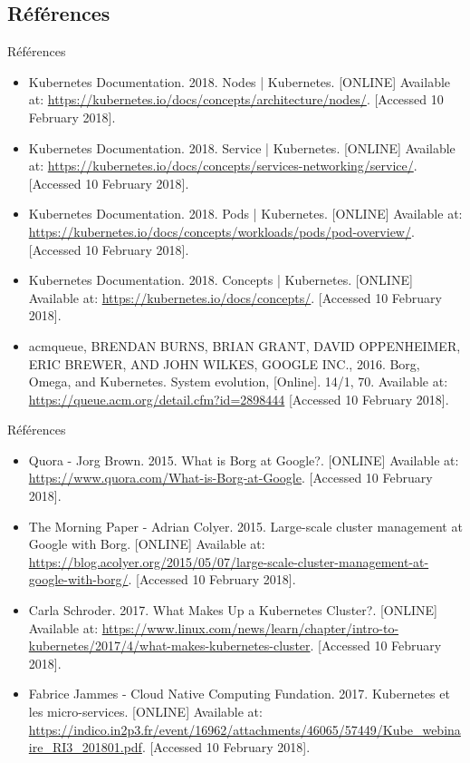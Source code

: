 \documentclass{bredelebeamer}
\begin{document}
\subsection{Références}
\begin{frame}{Références}
\begin{itemize}
\item Kubernetes Documentation. 2018. Nodes | Kubernetes. [ONLINE] Available at: \url{https://kubernetes.io/docs/concepts/architecture/nodes/}. [Accessed 10 February 2018].
\item Kubernetes Documentation. 2018. Service | Kubernetes. [ONLINE] Available at: \url{https://kubernetes.io/docs/concepts/services-networking/service/}. [Accessed 10 February 2018].
\item Kubernetes Documentation. 2018. Pods | Kubernetes. [ONLINE] Available at: \url{https://kubernetes.io/docs/concepts/workloads/pods/pod-overview/}. [Accessed 10 February 2018].
\item Kubernetes Documentation. 2018. Concepts | Kubernetes. [ONLINE] Available at: \url{https://kubernetes.io/docs/concepts/}. [Accessed 10 February 2018].
\item acmqueue, BRENDAN BURNS, BRIAN GRANT, DAVID OPPENHEIMER, ERIC BREWER, AND JOHN WILKES, GOOGLE INC., 2016. Borg, Omega, and Kubernetes. System evolution, [Online]. 14/1, 70. Available at: \url{https://queue.acm.org/detail.cfm?id=2898444} [Accessed 10 February 2018].
\end{itemize}
\end{frame}

\begin{frame}{Références}
\begin{itemize}
\item Quora - Jorg Brown. 2015. What is Borg at Google?. [ONLINE] Available at: \url{https://www.quora.com/What-is-Borg-at-Google}. [Accessed 10 February 2018].
\item The Morning Paper - Adrian Colyer. 2015. Large-scale cluster management at Google with Borg. [ONLINE] Available at: \url{https://blog.acolyer.org/2015/05/07/large-scale-cluster-management-at-google-with-borg/}. [Accessed 10 February 2018].
\item Carla Schroder. 2017. What Makes Up a Kubernetes Cluster?. [ONLINE] Available at: \url{https://www.linux.com/news/learn/chapter/intro-to-kubernetes/2017/4/what-makes-kubernetes-cluster}. [Accessed 10 February 2018].
\item Fabrice Jammes - Cloud Native Computing Fundation. 2017. Kubernetes et les micro-services. [ONLINE] Available at: \url{https://indico.in2p3.fr/event/16962/attachments/46065/57449/Kube_webinaire_RI3_201801.pdf}. [Accessed 10 February 2018].
\end{itemize}
\end{frame}
\end{document}
